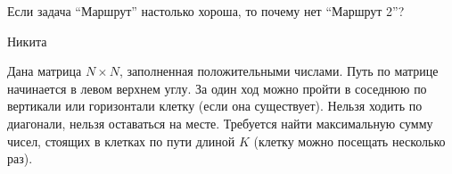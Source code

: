 \epigraph{Если задача ``Маршрут'' настолько хороша, то почему нет ``Маршрут 2''?}
{Никита}

Дана матрица $N \times N$, заполненная положительными числами. Путь по матрице начинается в левом верхнем углу. За один ход можно пройти в соседнюю по вертикали или горизонтали клетку (если она существует). Нельзя ходить по диагонали, нельзя оставаться на месте. Требуется найти максимальную сумму чисел, стоящих в клетках по пути длиной $K$ (клетку можно посещать несколько раз).